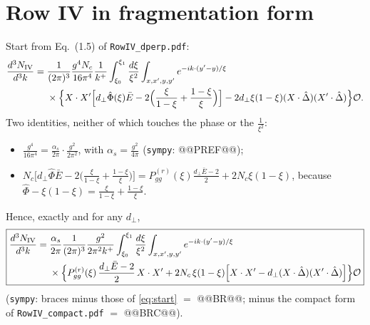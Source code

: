 \documentclass[10pt]{article}
\numberwithin{equation}{section}
\newcommand{\Dh}{\hat\Delta}
\newcommand{\OO}{\mathcal O}
\newcommand{\pre}{\frac{1}{(2\pi)^3}\frac{g^2}{2\pi^2k^+}}
\begin{document}
\section{Row IV in fragmentation form}\label{sec:conv}
Start from Eq.~(1.5) of \texttt{RowIV\_dperp.pdf}:
\begin{align}
\frac{d^3N_{\rm IV}}{d^3k}={}&\frac{1}{(2\pi)^3}\frac{g^4N_c}{16\pi^4}\frac{1}{k^+}\int_{\xi_0}^{\xi_1}\frac{d\xi}{\xi^2}\int_{x,x',y,y'}e^{-ik\cdot(y'-y)/\xi}\notag\\
&\times\Big\{X\cdot X'\Big[d_\perp\hat\Phi(\xi)\bar E-2\Big(\frac{\xi}{1-\xi}+\frac{1-\xi}{\xi}\Big)\Big]-2d_\perp\xi(1-\xi)(X\cdot\Dh)(X'\cdot\Dh)\Big\}\OO .
\label{eq:start}
\end{align}
Two identities, neither of which touches the phase or the $\frac{1}{\xi^2}$:
\begin{itemize}
\item $\frac{g^4}{16\pi^4}=\frac{\alpha_s}{2\pi}\cdot\frac{g^2}{2\pi^2}$, with $\alpha_s=\frac{g^2}{4\pi}$ (\texttt{sympy}: @@PREF@@);
\item $N_c\big[d_\perp\hat\Phi\bar E-2\big(\frac{\xi}{1-\xi}+\frac{1-\xi}{\xi}\big)\big]=P^{(r)}_{gg}(\xi)\frac{d_\perp\bar E-2}{2}+2N_c\xi(1-\xi)$, because $\hat\Phi-\xi(1-\xi)=\frac{\xi}{1-\xi}+\frac{1-\xi}{\xi}$.
\end{itemize}
Hence, exactly and for any $d_\perp$,
\begin{equation}
\boxed{\begin{aligned}
\frac{d^3N_{\rm IV}}{d^3k}={}&\frac{\alpha_s}{2\pi}\pre\int_{\xi_0}^{\xi_1}\frac{d\xi}{\xi^2}\int_{x,x',y,y'}e^{-ik\cdot(y'-y)/\xi}\\
&\times\Big\{P^{(r)}_{gg}(\xi)\,\frac{d_\perp\bar E-2}{2}\,X\cdot X'+2N_c\,\xi(1-\xi)\Big[X\cdot X'-d_\perp(X\cdot\Dh)(X'\cdot\Dh)\Big]\Big\}\OO
\end{aligned}}
\label{eq:conv}
\end{equation}
(\texttt{sympy}: braces minus those of \eqref{eq:start} $=$ @@BR@@; minus the compact form of \texttt{RowIV\_compact.pdf} $=$ @@BRC@@).
\end{document}
